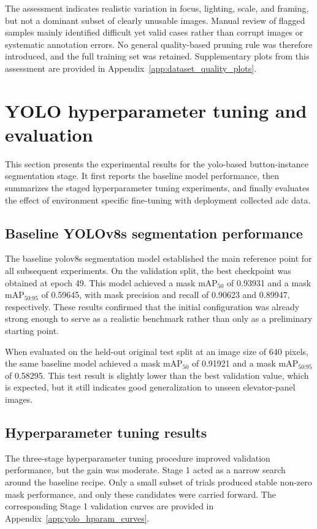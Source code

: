 The assessment indicates realistic variation in focus, lighting, scale, and
framing, but not a dominant subset of clearly unusable images. Manual review of
flagged samples mainly identified difficult yet valid cases rather than corrupt
images or systematic annotation errors. No general quality-based pruning rule
was therefore introduced, and the full training set was retained.
Supplementary plots from this assessment are provided in
Appendix~\ref{app:dataset_quality_plots}.

\section{YOLO hyperparameter tuning and evaluation}
This section presents the experimental results for the \gls{yolo}-based button-instance segmentation stage. 
It first reports the baseline model performance, then summarizes the staged hyperparameter tuning experiments, 
and finally evaluates the effect of environment specific fine-tuning with deployment collected \gls{adc} data.
\subsection{Baseline YOLOv8s segmentation performance}

The baseline \gls{yolo}v8s segmentation model established the main reference point for all
subsequent experiments. On the validation split,
the best checkpoint was obtained at epoch 49. This model achieved a mask
$\mathrm{mAP}_{50}$ of 0.93931 and a mask
$\mathrm{mAP}_{50\text{:}95}$ of 0.59645, with mask precision and recall of
0.90623 and 0.89947, respectively. These results confirmed that the initial
configuration was already strong enough to serve as a realistic benchmark rather
than only as a preliminary starting point.

When evaluated on the held-out original test split at an image size of 640 pixels,
the same baseline model achieved a mask $\mathrm{mAP}_{50}$ of 0.91921 and a mask
$\mathrm{mAP}_{50\text{:}95}$ of 0.58295. This test result is slightly lower than the
best validation value, which is expected, but it still indicates good
generalization to unseen elevator-panel images.

\subsection{Hyperparameter tuning results}

The three-stage hyperparameter tuning procedure improved validation performance,
but the gain was moderate. Stage 1 acted as a narrow search around the baseline
recipe. Only a small subset of trials produced stable non-zero mask performance,
and only these candidates were carried forward. The corresponding Stage 1
validation curves are provided in Appendix~\ref{app:yolo_hparam_curves}.


